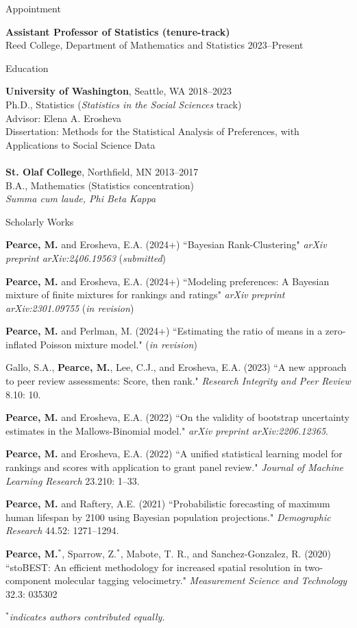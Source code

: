 \documentclass{resume} %
\begin{document}
\begin{rSection}{Appointment}

\textbf{Assistant Professor of Statistics (tenure-track)}
\\ Reed College, Department of Mathematics and Statistics \hfill{2023--Present}
\end{rSection}

\begin{rSection}{Education}

\textbf{University of Washington}, Seattle, WA \hfill {2018--2023} 
\\ Ph.D., Statistics ({\it Statistics in the Social Sciences} track)
\\ Advisor: Elena A. Erosheva
\\ Dissertation: Methods for the Statistical Analysis of Preferences, with Applications to Social Science Data
\\
\\\textbf{St. Olaf College}, Northfield, MN \hfill {2013--2017} 
\\ B.A., Mathematics (Statistics concentration)
\\ {\it Summa cum laude, Phi Beta Kappa}
\end{rSection}


\begin{rSection}{Scholarly Works}

\textbf{Pearce, M.} and Erosheva, E.A. (2024+) ``Bayesian Rank-Clustering" \textit{arXiv preprint arXiv:2406.19563} (\textit{submitted})

\textbf{Pearce, M.} and Erosheva, E.A. (2024+) ``Modeling preferences: A Bayesian mixture of finite mixtures for rankings and ratings" \textit{arXiv preprint arXiv:2301.09755} (\textit{in revision})

\textbf{Pearce, M.} and Perlman, M. (2024+) ``Estimating the ratio of means in a zero-inflated Poisson mixture model." (\textit{in revision})

Gallo, S.A., \textbf{Pearce, M.}, Lee, C.J., and Erosheva, E.A. (2023) ``A new approach to peer review assessments: Score, then rank." \textit{Research Integrity and Peer Review} 8.10: 10.

\textbf{Pearce, M.} and Erosheva, E.A. (2022) ``On the validity of bootstrap uncertainty estimates in the Mallows-Binomial model." \textit{arXiv preprint arXiv:2206.12365}.

\textbf{Pearce, M.} and Erosheva, E.A. (2022) ``A unified statistical learning model for rankings and scores with application to grant panel review." \textit{Journal of Machine Learning Research} 23.210: 1--33.

\textbf{Pearce, M.} and Raftery, A.E. (2021) ``Probabilistic forecasting of maximum human lifespan by 2100 using Bayesian population projections." {\em Demographic Research} 44.52: 1271--1294.

\textbf{Pearce, M.}$^*$, Sparrow, Z.$^*$, Mabote, T. R., and Sanchez-Gonzalez, R. (2020) ``stoBEST: An efficient methodology for increased spatial resolution in two-component molecular tagging velocimetry." {\em Measurement Science and Technology} 32.3: 035302

{\em $^*$indicates authors contributed equally.}
\end{rSection}
\end{document}
